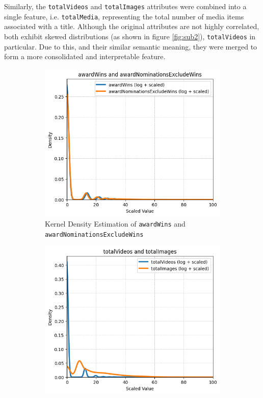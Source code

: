Similarly, the \texttt{totalVideos} and \texttt{totalImages} attributes were combined into a single
feature, i.e. \texttt{totalMedia}, representing the total number of media items associated with a title.
Although the original attributes are not highly correlated, both exhibit skewed distributions (as shown in figure \ref{fig:sub2}), \texttt{totalVideos} in particular.
Due to this, and their similar semantic meaning, they were merged to form a more consolidated and
interpretable feature.

\begin{figure}[H]
    \centering
    \begin{subfigure}{0.48\textwidth}
        \includegraphics[width=\textwidth]{plots/nominations_distrib.png}
        \captionsetup{width=0.9\linewidth, justification=centering}
        \caption{Kernel Density Estimation of \texttt{awardWins} and \texttt{awardNominationsExcludeWins}}
        \label{fig:sub1}
    \end{subfigure}
    \begin{subfigure}{0.48\textwidth}
        \includegraphics[width=\textwidth]{plots/totalVideos_Images_distrib.png}

\end{subfigure}
\end{figure}
